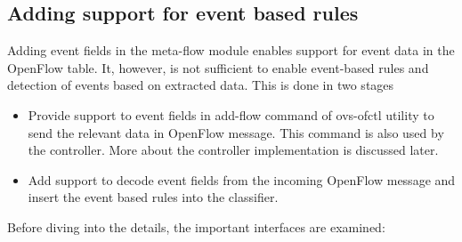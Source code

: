 \subsection{Adding support for event based rules}
Adding event fields in the meta-flow module enables support for event data in the OpenFlow table. It, however, is not sufficient to enable event-based rules and detection of events based on extracted data. This is done in two stages
\begin{itemize}
\item Provide support to event fields in add-flow command of ovs-ofctl utility to send the relevant data in OpenFlow message. This command is also used by the controller. More about the controller implementation is discussed later.
\item Add support to decode event fields from the incoming OpenFlow message and insert the event based rules into the classifier.
\end{itemize}
Before diving into the details, the important interfaces are examined:
